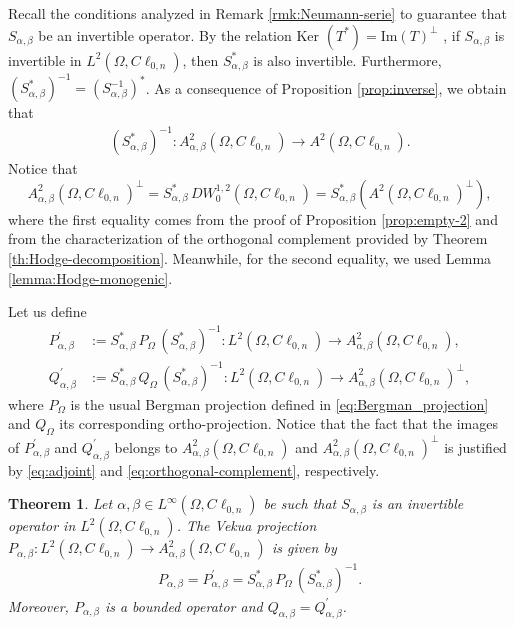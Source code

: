 \documentclass[12pt]{article}
\newcommand{\comment}[1]{\marginpar{\hfuzz=5ex
\scriptsize$\stackrel{?}{\longleftarrow}$\\\hspace*{-3ex}
{\fbox{\parbox{20ex}{\hfuzz=15ex \raggedright\sf#1 }}} }}
\newtheorem{theorem}{Theorem}
\begin{document}
Recall the conditions analyzed in Remark \ref{rmk:Neumann-serie} to guarantee that $S_{\alpha,\beta}$ be an invertible operator. By the relation $\text{Ker }(T^*)=\text{Im}(T)^{\bot}$ \cite[Lemma\ 1.4]{Kub2012}, if $S_{\alpha,\beta}$ is invertible in $L^2(\Omega, C\ell_{0,n})$, then $S_{\alpha,\beta}^*$ is also invertible. Furthermore, $(S_{\alpha,\beta}^*)^{-1}=(S_{\alpha,\beta}^{-1})^*$. As a consequence of Proposition \ref{prop:inverse}, we obtain that
\begin{align}\label{eq:adjoint-inverse}
 (S_{\alpha,\beta}^*)^{-1}\colon A_{\alpha,\beta}^2(\Omega,C\ell_{0,n}) \to A^2(\Omega,C\ell_{0,n}).
\end{align}
Notice that
\begin{equation}\label{eq:orthogonal-complement}
A_{\alpha,\beta}^2(\Omega,C\ell_{0,n})^{\bot}=S_{\alpha,\beta}^* \, DW_0^{1,2}(\Omega,C\ell_{0,n})=S_{\alpha,\beta}^*( A^2(\Omega,C\ell_{0,n})^{\bot}),
\end{equation}
where the first equality comes from the proof of Proposition \ref{prop:empty-2} and from the characterization of the orthogonal complement provided by Theorem \ref{th:Hodge-decomposition}. Meanwhile, for the second equality, we used Lemma \ref{lemma:Hodge-monogenic}.

Let us define 
\begin{align*}
P_{\alpha,\beta}^{\prime}&:=S_{\alpha,\beta}^*\, P_{\Omega} \,(S_{\alpha,\beta}^*)^{-1}\colon L^2(\Omega,C\ell_{0,n}) \to A_{\alpha,\beta}^2(\Omega,C\ell_{0,n}),\\
Q_{\alpha,\beta}^{\prime}&:=S_{\alpha,\beta}^*\, Q_{\Omega}\, (S_{\alpha,\beta}^*)^{-1} \colon L^2(\Omega,C\ell_{0,n}) \to A_{\alpha,\beta}^2(\Omega,C\ell_{0,n})^{\bot},
\end{align*}
where $P_{\Omega}$ is the usual Bergman projection defined in 
\eqref{eq:Bergman_projection} and $Q_{\Omega}$ its corresponding ortho-projection. Notice that the fact that the images of $P_{\alpha,\beta}^{\prime}$ and $Q_{\alpha,\beta}^{\prime}$ belongs to $A_{\alpha,\beta}^2(\Omega,C\ell_{0,n})$ and $A_{\alpha,\beta}^2(\Omega,C\ell_{0,n})^{\bot}$ is justified by \eqref{eq:adjoint} and \eqref{eq:orthogonal-complement}, respectively.
\begin{theorem}\label{theo:Bergman-projection}
Let $\alpha, \beta\in L^{\infty}(\Omega,C\ell_{0,n})$ be such that $S_{\alpha,\beta}$ is an invertible operator in $L^2(\Omega, C\ell_{0,n})$.  
The Vekua projection $P_{\alpha,\beta}\colon L^2(\Omega,C\ell_{0,n}) \to A_{\alpha,\beta}^2(\Omega,C\ell_{0,n})$ is given by 
\begin{align}\label{eq:projection1}
    P_{\alpha,\beta}=P_{\alpha,\beta}^{\prime}=S_{\alpha,\beta}^*\, P_{\Omega} \,(S_{\alpha,\beta}^*)^{-1}.
\end{align}
Moreover, $P_{\alpha,\beta}$ is a bounded operator and $Q_{\alpha,\beta}=Q_{\alpha,\beta}^{\prime}$.
\end{theorem}
\end{document}
